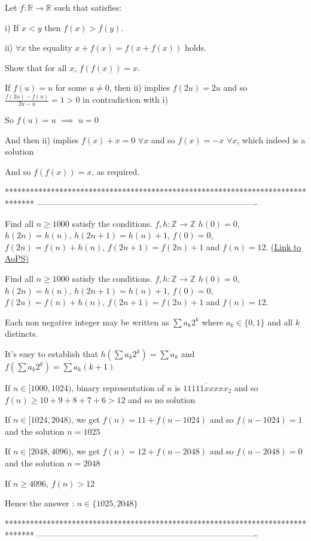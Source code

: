 \begin{solution}
	\begin{tcolorbox}Let $f: \mathbb{R} \to \mathbb{R}$ such that satisfies:

i) If $x<y$ then $f(x)>f(y)$.

ii) $\forall x$ the equality $x+f(x)=f(x+f(x))$ holds.

Show that for all $x$, $f(f(x))=x$.\end{tcolorbox}
If $f(u)=u$ for some $u\ne 0$, then ii) implies $f(2u)=2u$ and so $\frac{f(2u)-f(u)}{2u-u}=1>0$  in contradiction with i)

So $f(u)=u$ $\implies$ $u=0$

And then ii) implies $f(x)+x=0$ $\forall x$ and so $\boxed{f(x)=-x}$ $\forall x$, which indeed is a solution

And so $f(f(x))=x$, as required.
\end{solution}
*******************************************************************************
-------------------------------------------------------------------------------

\begin{problem}
	Find all $ n\geq 1000 $ satisfy the conditions.
$ f, h:\mathbb{Z}\to\mathbb{Z} $
$h({0}) =0$, $h({2n}) = h({n})$,  $h({2n+1}) = h({n})+1$,
$f({0}) =0$, $f({2n}) =  f({n})+ h({n})$, $f({2n+1}) = f({2n})+1$
and $f({n}) = 12$.
	\flushright \href{https://artofproblemsolving.com/community/c6h475840}{(Link to AoPS)}
\end{problem}



\begin{solution}
	\begin{tcolorbox}Find all $ n\geq 1000 $ satisfy the conditions.
$ f, h:\mathbb{Z}\to\mathbb{Z} $
$h({0}) =0$, $h({2n}) = h({n})$,  $h({2n+1}) = h({n})+1$,
$f({0}) =0$, $f({2n}) =  f({n})+ h({n})$, $f({2n+1}) = f({2n})+1$
and $f({n}) = 12$.\end{tcolorbox}
Each non negative integer may be written as $\sum a_k2^k$ where $a_k\in\{0,1\}$ and all $k$ distincts.

It's easy to establish that $h(\sum a_k2^k)=\sum a_k$ and $f(\sum a_k2^k)=\sum a_k(k+1)$

If $n\in[1000,1024)$, binary representation of $n$ is $\overline{11111xxxxx}_2$ and so $f(n)\ge 10+9+8+7+6>12$ and so no solution

If $n\in[1024,2048)$, we get $f(n)=11+f(n-1024)$ and so $f(n-1024)=1$ and the solution $n=1025$

If $n\in[2048,4096)$, we get $f(n)=12+f(n-2048)$ and so $f(n-2048)=0$ and the solution $n=2048$

If $n\ge 4096$, $f(n)>12$

Hence the answer : $\boxed{n\in\{1025,2048\}}$
\end{solution}
*******************************************************************************
-------------------------------------------------------------------------------

